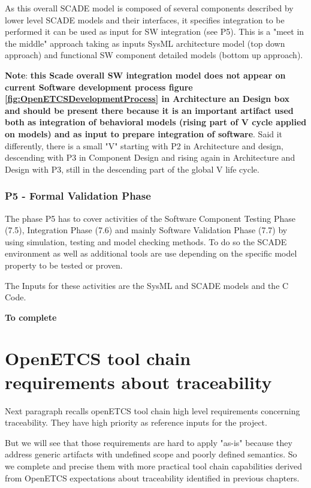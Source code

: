 \documentclass[11pt]{template/openetcs_report}
\begin{document}
As this overall SCADE model is composed of several components described by lower level SCADE models and their interfaces, it specifies integration to be performed it can be used as input for SW integration (see P5). This is a "meet in the middle" approach taking as inputs SysML architecture model (top down approach) and functional SW component detailed models (bottom up approach).

\textbf{Note}: \textbf{this Scade overall SW integration model does not appear on current Software development process figure \ref{fig:OpenETCSDevelopmentProcess} in Architecture an Design box and should be present there because it is an important artifact used both as integration of behavioral models (rising part of V cycle applied on models) and as input to prepare integration of software}. Said it differently, there is a small "V" starting with P2 in Architecture and design, descending with P3 in Component Design and rising again in Architecture and Design with P3, still in the descending part of the global V life cycle.



\subsection{P5 - Formal Validation Phase}

The phase P5 has to cover activities of the Software Component Testing Phase (7.5), Integration Phase (7.6) and mainly Software Validation Phase (7.7) by using simulation, testing and model checking methods. To do so the SCADE environment as well as additional tools are use depending on the specific model property to be tested or proven. 

The Inputs for these activities are the SysML and SCADE models and the C Code.

\textbf{To complete}

\chapter{OpenETCS tool chain requirements about traceability}
\label{sec-4} 

Next paragraph recalls openETCS tool chain  high level requirements concerning traceability. They have high priority as reference inputs for the project.

But we will see that those requirements are hard to apply "as-is" because they address generic artifacts with undefined scope and poorly defined semantics. So we complete and precise them with more practical tool chain capabilities derived from OpenETCS expectations about traceability identified in previous chapters. 
\end{document}
